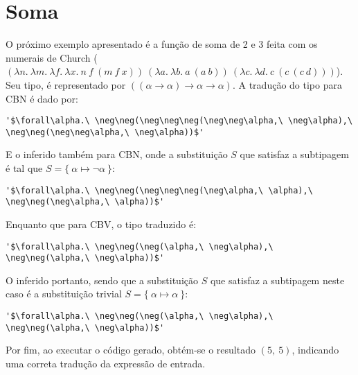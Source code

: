 \section{Soma}
O próximo exemplo apresentado é a função de soma de 2 e 3 feita com os numerais de Church ($(\lambda n.\ \lambda m.\ \lambda f.\ \lambda x.\ n\ f\ (m\ f\ x))\ (\lambda a.\ \lambda b.\ a\ (a\ b))\ (\lambda c.\ \lambda d.\ c\ (c\ (c\ d)))$).
Seu tipo, é representado por $((\alpha \to \alpha) \to \alpha \to \alpha)$.
A tradução do tipo para CBN é dado por:
\lstset{extendedchars=false, escapeinside=''}
\begin{lstlisting}[style=output,caption={Tradução em CBN do tipo da função de soma}]
  '$\forall\alpha.\ \neg\neg(\neg\neg\neg(\neg\neg\alpha,\ \neg\alpha),\ \neg\neg(\neg\neg\alpha,\ \neg\alpha))$'
\end{lstlisting}
E o inferido também para CBN, onde a substituição $S$ que satisfaz a subtipagem é tal que $S = \{\ \alpha \mapsto \neg\alpha\ \}$:
\lstset{extendedchars=false, escapeinside=''}
\begin{lstlisting}[style=output,caption={Inferência do tipo da função de soma traduzido em CBN}]
  '$\forall\alpha.\ \neg\neg(\neg\neg\neg(\neg\alpha,\ \alpha),\ \neg\neg(\neg\alpha,\ \alpha))$'
\end{lstlisting}
Enquanto que para CBV, o tipo traduzido é:
\lstset{extendedchars=false, escapeinside=''}
\begin{lstlisting}[style=output,caption={Tradução em CBV do tipo da função de soma}]
  '$\forall\alpha.\ \neg\neg(\neg(\alpha,\ \neg\alpha),\ \neg\neg(\alpha,\ \neg\alpha))$'
\end{lstlisting}
O inferido portanto, sendo que a substituição $S$ que satisfaz a subtipagem neste caso é a substituição trivial $S = \{\ \alpha \mapsto \alpha\ \}$:
\lstset{extendedchars=false, escapeinside=''}
\begin{lstlisting}[style=output,caption={Inferência do tipo da função de soma traduzido em CBV}]
  '$\forall\alpha.\ \neg\neg(\neg(\alpha,\ \neg\alpha),\ \neg\neg(\alpha,\ \neg\alpha))$'
\end{lstlisting}
Por fim, ao executar o código gerado, obtém-se o resultado $(5,\ 5)$, indicando uma correta tradução da expressão de entrada.

